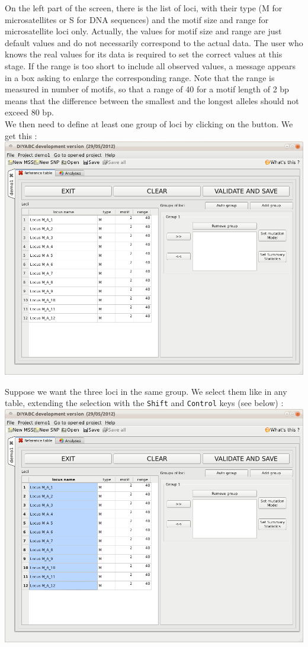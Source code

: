 On the left part of the screen, there is the list of loci, with their type (M for microsatellites or S for DNA sequences) and the motif size and range for microsatellite loci only. Actually, the values for motif size and range are just default values and do not necessarily correspond to the actual data. The user who knows the real values for its data is required to set the correct values at this stage. If the range is too short to include all observed values, a message appears in a box asking to enlarge the corresponding range. Note that the range is measured in number of motifs, so that a range of 40 for a motif length of 2 bp means that the difference between the smallest and the longest alleles should not exceed 80 bp.\\
We then need to define at least one group of loci by clicking on the  button. We get this :\\

\includegraphics[scale=0.35]{gui_pictures/Capture-DIYABC-16.png} 

Suppose we want the three loci in the same group. We select them like in any table, extending the selection with the \texttt{Shift} and \texttt{Control} keys (see below) : \\

\includegraphics[scale=0.35]{gui_pictures/Capture-DIYABC-17.png} 

